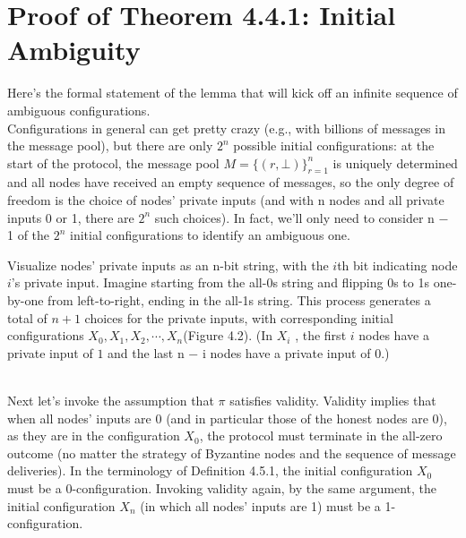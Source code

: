 \section{Proof of Theorem 4.4.1: Initial Ambiguity}
Here’s the formal statement of the lemma that will kick off an infinite sequence of ambiguous
configurations.\\
Configurations in general can get pretty crazy (e.g., with billions of messages in the
message pool), but there are only $2^n$ possible initial configurations: at the start of the
protocol, the message pool $M = \{(r, \bot)\}^n_{r=1}$ is uniquely determined and all nodes have
received an empty sequence of messages, so the only degree of freedom is the choice of
nodes’ private inputs (and with n nodes and all private inputs 0 or 1, there are $2^n$
such choices). In fact, we’ll only need to consider n − 1 of the $2^n$
initial configurations to identify
an ambiguous one.\\

\begin{myproof}
Visualize nodes’ private inputs as an n-bit string, with the $i$th bit
indicating node $i$’s private input. Imagine starting from the all-0s string and flipping 0s to 1s
one-by-one from left-to-right, ending in the all-1s string. This process generates a total of $n+1$
choices for the private inputs, with corresponding initial configurations $X_0, X_1, X_2, \cdots, X_n$(Figure 4.2). (In $X_i$
, the first $i$ nodes have a private input of $1$ and the last n − i nodes have a private input of 0.)\end{myproof}\\

Next let’s invoke the assumption that $\pi$ satisfies validity. Validity implies that when
all nodes’ inputs are 0 (and in particular those of the honest nodes are 0), as they are in
the configuration $X_0$, the protocol must terminate in the all-zero outcome (no matter the
strategy of Byzantine nodes and the sequence of message deliveries). In the terminology of Definition 4.5.1, the initial configuration $X_0$ must be a 0-configuration. Invoking validity again, by the same argument, the initial configuration $X_n$ (in which all nodes’ inputs are 1) must be a 1-configuration.

